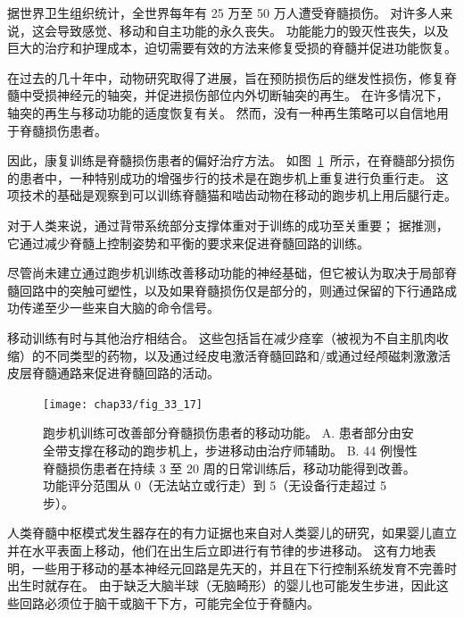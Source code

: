 \begin{proposition}[康复训练可改善人类脊髓损伤后的行走] \label{box:33_4}
	
	\quad \quad 据世界卫生组织统计，全世界每年有 25 万至 50 万人遭受脊髓损伤。
	对许多人来说，这会导致感觉、移动和自主功能的永久丧失。
	功能能力的毁灭性丧失，以及巨大的治疗和护理成本，迫切需要有效的方法来修复受损的脊髓并促进功能恢复。
	
	\quad \quad 在过去的几十年中，动物研究取得了进展，旨在预防损伤后的继发性损伤，修复脊髓中受损神经元的轴突，并促进损伤部位内外切断轴突的再生。
	在许多情况下，轴突的再生与移动功能的适度恢复有关。
	然而，没有一种再生策略可以自信地用于脊髓损伤患者。
	
	\quad \quad 因此，康复训练是脊髓损伤患者的偏好治疗方法。
	如图~\ref{fig:33_17}~所示，在脊髓部分损伤的患者中，一种特别成功的增强步行的技术是在跑步机上重复进行负重行走。
	这项技术的基础是观察到可以训练脊髓猫和啮齿动物在移动的跑步机上用后腿行走。
	
	\quad \quad 对于人类来说，通过背带系统部分支撑体重对于训练的成功至关重要；
	据推测，它通过减少脊髓上控制姿势和平衡的要求来促进脊髓回路的训练。
	
	\quad \quad 尽管尚未建立通过跑步机训练改善移动功能的神经基础，但它被认为取决于局部脊髓回路中的突触可塑性，以及如果脊髓损伤仅是部分的，则通过保留的下行通路成功传递至少一些来自大脑的命令信号。
	
	\quad \quad 移动训练有时与其他治疗相结合。
	这些包括旨在减少痉挛（被视为不自主肌肉收缩）的不同类型的药物，以及通过经皮电激活脊髓回路和/或通过经颅磁刺激激活皮层脊髓通路来促进脊髓回路的活动。
	
\end{proposition}


\begin{figure}[htbp]
	\centering
	\texttt{[image: chap33/fig\_33\_17]}
	\caption{跑步机训练可改善部分脊髓损伤患者的移动功能。
		A. 患者部分由安全带支撑在移动的跑步机上，步进移动由治疗师辅助。
		B. 44 例慢性脊髓损伤患者在持续 3 至 20 周的日常训练后，移动功能得到改善。
		功能评分范围从 0（无法站立或行走）到 5（无设备行走超过 5 步）\cite{wernig1995laufband}。}
	\label{fig:33_17}
\end{figure}


人类脊髓中枢模式发生器存在的有力证据也来自对人类婴儿的研究，如果婴儿直立并在水平表面上移动，他们在出生后立即进行有节律的步进移动。
这有力地表明，一些用于移动的基本神经元回路是先天的，并且在下行控制系统发育不完善时出生时就存在。
由于缺乏大脑半球（无脑畸形）的婴儿也可能发生步进，因此这些回路必须位于脑干或脑干下方，可能完全位于脊髓内。


